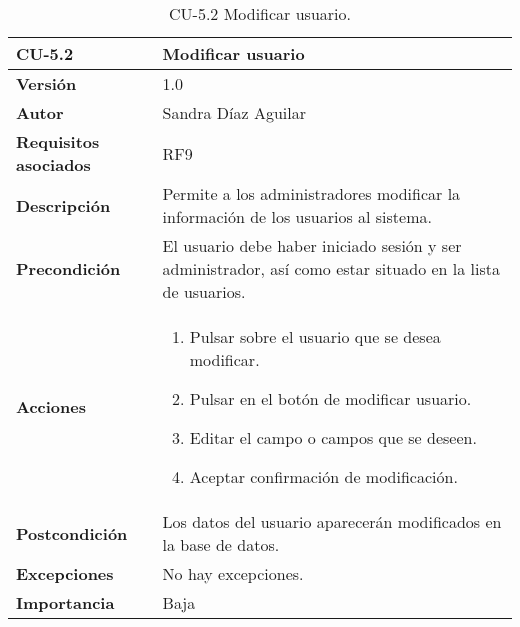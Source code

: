 \begin{table}[p]
	\centering
	\begin{tabularx}{\linewidth}{ p{} p{} }
		\toprule
		\textbf{CU-5.2}    & \textbf{Modificar usuario}\\
		\toprule
		\textbf{Versión}              & 1.0    \\
		\textbf{Autor}                & Sandra Díaz Aguilar \\
		\textbf{Requisitos asociados} & RF9 \\
		\textbf{Descripción}          & Permite a los administradores modificar la información de los usuarios al sistema. \\
		\textbf{Precondición}         & El usuario debe haber iniciado sesión y ser administrador, así como estar situado en la lista de usuarios.  \\
		\textbf{Acciones}             &
		\begin{enumerate}
			\def\labelenumi{\arabic{enumi}.}
			\tightlist
			\item Pulsar sobre el usuario que se desea modificar. 
			\item Pulsar en el botón de modificar usuario. 
            \item Editar el campo o campos que se deseen. 
			\item Aceptar confirmación de modificación. 
		\end{enumerate}\\
		\textbf{Postcondición}        & Los datos del usuario aparecerán modificados en la base de datos.  \\
		\textbf{Excepciones}          & No hay excepciones. \\
		\textbf{Importancia}          & Baja \\
		\bottomrule
	\end{tabularx}
	\caption{CU-5.2 Modificar usuario.}
\end{table}


